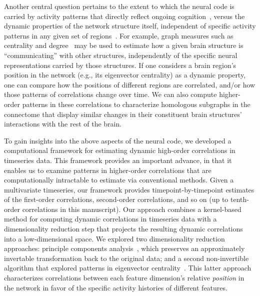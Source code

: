 \documentclass[english]{article}
\begin{document}
Another central question pertains to the extent to which the neural
code is carried by activity patterns that directly reflect ongoing
cognition~\citep[e.g., following][]{HaxbEtal01, NormEtal06}, versus
the dynamic properties of the network structure itself, independent of
specific activity patterns in any given set of regions~\citep[e.g.,
following][]{BassEtal06}.  For example, graph measures such as
centrality and degree~\citep{BullSpor09} may be used to estimate how a
given brain structure is ``communicating'' with other structures,
independently of the specific neural representations carried by those
structures.  If one considers a brain region's position in the network
(e.g., its eigenvector centrality) as a dynamic property, one can
compare how the positions of different regions are correlated, and/or
how those patterns of correlations change over time.  We can also
compute higher-order patterns in these correlations to characterize
homologous subgraphs in the connectome that display similar changes in
their constituent brain structures' interactions with the rest of the
brain.

To gain insights into the above aspects of the neural code, we
developed a computational framework for estimating dynamic high-order
correlations in timeseries data. This framework provides an important
advance, in that it enables us to examine patterns in higher-order
correlations that are computationally intractable to estimate via
conventional methods.  Given a multivariate timeseries, our framework
provides timepoint-by-timepoint estimates of the first-order
correlations, second-order correlations, and so on (up to tenth-order
correlations in this manuscript).  Our approach combines a
kernel-based method for computing dynamic correlations in timeseries
data with a dimensionality reduction step that projects the resulting
dynamic correlations into a low-dimensional space.  We explored two
dimensionality reduction approaches: principle components
analysis~\citep[PCA;][]{Pear01}, which preserves an approximately invertable
transformation back to the original data; and a second non-invertible
algorithm that explored patterns in eigenvector
centrality~\citep{Land95}.  This latter approach characterizes
correlations between each feature dimension's relative
\textit{position} in the network in favor of the specific activity
histories of different features.
\end{document}
